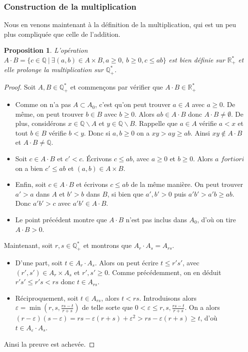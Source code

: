 \documentclass[french]{book}
\theoremstyle{plain}
\newtheorem{prop}{Proposition}[chapter]
\theoremstyle{definition}
\theoremstyle{remark}
\begin{document}
\subsubsection{Construction de la multiplication}
Nous en venons maintenant à la définition de la multiplication, qui est un peu plus compliquée que celle de l'addition.
\begin{prop}
	L'opération \(A\cdot B=\{c\in\mathbb{Q}\ |\ \exists(a,b)\in A\times B, a\ge0,\ b\ge0 ,c\le ab\}\) est bien définie sur \(\mathbb{R}_{+}^{*}\) et elle prolonge la multiplication sur \(\mathbb{Q}_{+}^{*}\).
\end{prop}
\begin{proof}
	Soit \(A,B\in\mathbb{Q}_{+}^{*}\) et commençons par vérifier que \(A\cdot B\in\mathbb{R}_{+}^{*}\)
	\begin{itemize}
		\item Comme on n'a pas $A \subset A_0$, c'est qu'on peut trouver $a \in A$ avec $a \geqslant 0$. De même, on peut trouver $b \in B$ avec $b \geqslant 0$. Alors $ab \in A \cdot B$ donc $A \cdot B \neq \emptyset$. De plus, considérons $x \in \mathbb{Q} \backslash A$ et $y \in \mathbb{Q} \backslash B$. Rappelle que $a \in A$ vérifie $a < x$ et tout $b \in B$ vérifie $b < y$. Donc si $a, b \geqslant 0$ on a $xy > ay \geqslant ab$. Ainsi $xy \notin A \cdot B$ et $A \cdot B \neq \mathbb{Q}$.
		\item Soit $c \in A \cdot B$ et $c' < c$. Écrivons $c \leqslant ab$, avec $a \geqslant 0$ et $b \geqslant 0$. Alors $a$ $fortiori$ on a bien $c' \leqslant ab$ et $(a, b) \in A \times B$.
		\item Enfin, soit $c \in A \cdot B$ et écrivons $c \leqslant ab$ de la même manière. On peut trouver $a' > a$ dans $A$ et $b' > b$ dans $B$, si bien que $a', b' > 0$ puis $a'b' > a'b \geqslant ab$. Donc $a'b' > c$ avec $a'b' \in A \cdot B$.
		\item Le point précédent montre que $A \cdot B$ n'est pas inclus dans $A_0$, d'où on tire $A \cdot B > 0$.
	\end{itemize}
	Maintenant, soit $r, s \in \mathbb{Q}_{+}^{*}$ et montrons que $A_r \cdot A_s = A_{rs}$.
	\begin{itemize}
		\item D'une part, soit $t \in A_r \cdot A_s$. Alors on peut écrire $t \leqslant r's'$, avec $(r', s') \in A_r \times A_s$ et $r', s' \geqslant 0$. Comme précédemment, on en déduit $r's' \leqslant r's < rs$ donc $t \in A_{rs}$.
		\item Réciproquement, soit $t \in A_{rs}$, alors $t < rs$. Introduisons alors $\varepsilon = \min(r, s, \frac{rs-t}{r+s})$ de telle sorte que $0 < \varepsilon \leqslant r, s, \frac{rs-t}{r+s}$. On a alors $(r-\varepsilon)(s-\varepsilon) = rs - \varepsilon(r+s) + \varepsilon^2 > rs - \varepsilon(r+s) \geqslant t$, d'où $t \in A_{\varepsilon} \cdot A_s$.
	\end{itemize}
	Ainsi la preuve est achevée.
\end{proof}
\end{document}
